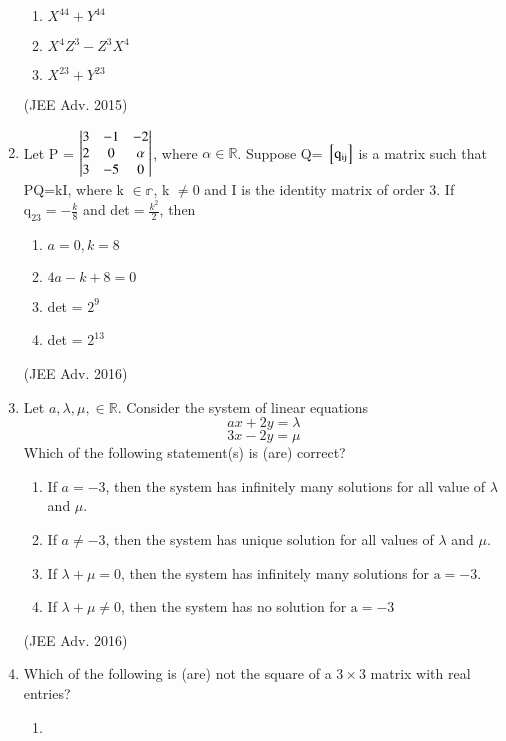 \documentclass[journal,12pt,twocolumn]{IEEEtran}
\theoremstyle{remark}
\begin{document}
\begin{enumerate}[label=\arabic*)]
\begin{enumerate}[label=(\alph*)]
						\item $X^{44} + Y^{44}$
						\item $X^4Z^3 -Z^3X^4$
						\item $X^{23} + Y^{23}$
					\end{enumerate}
					\hfill (JEE Adv. 2015)\\
				\item 
					Let P = 
						$\begin{vmatrix}		
							3 & -1 & -2\\
							2 & 0 & \alpha\\
							3 & -5 & 0
						\end{vmatrix}$,
					where $\alpha \in \mathbb{R}$. Suppose Q= $\mathrm{{}\left[q_{ij}\right]}$ is a matrix such that PQ=kI, where k $\in \mathbb{r}$, k $\neq 0$ and I is the identity matrix of order $3$. If $\mathrm{q_{23}} = -\frac{k}{8}$ and det$= \frac{k^2}{2}$, then
					\begin{enumerate}[label=(\alph*)]
						\item $a=0, k=8$
						\item $4a-k+8=0$
						\item det  = $2^9$
						\item det  = $2^{13}$
					\end{enumerate}
					\hfill (JEE Adv. 2016)
				\item
					Let $a, \lambda, \mu, \in \mathbb{R}$. Consider the system of linear equations $$ax+2y=\lambda$$ $$3x-2y=\mu$$ Which of the following statement(s) is (are) correct?
					\begin{enumerate}[label=(\alph*)]
						\item If $a=-3$, then the system has infinitely many solutions for all value of $\lambda$ and $\mu$.
						\item If $a \neq -3$, then the system has unique solution for all values of $\lambda$ and $\mu$.
						\item If $\lambda + \mu = 0$, then the system has infinitely many solutions for $\mathrm{a} = -3$.
						\item If $\lambda + \mu \neq 0$, then the system has no solution for $\mathrm{a} = -3$
					\end{enumerate}
					\hfill (JEE Adv. 2016)\\
				\item 
					Which of the following is (are) not the square of a $3 \times 3$ matrix with real entries?
						\begin{enumerate}[label=(\alph*)]
							\item 

\end{enumerate}
\end{enumerate}
\end{document}
